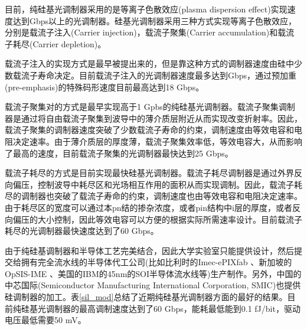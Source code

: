 目前，纯硅基光调制器采用的是等离子色散效应(plasma dispersion effect)实现速度达到Gbps以上的光调制器。硅基光调制器采用三种方式实现等离子色散效应，分别是载流子注入(Carrier injection)，载流子聚集(Carrier accumulation)和载流子耗尽(Carrier depletion)。

载流子注入的实现方式是最早被提出来的，但是靠这种方式的调制器速度由硅中少数载流子寿命决定。目前载流子注入的光调制器速度最多达到Gbps，通过预加重(pre-emphasis)的特殊码形速度目前最高达到18 Gbps\cite{manipatruni2007high}。

载流子聚集对的方式是最早实现高于1 Gpbs的纯硅基光调制器。载流子聚集调制器是通过将自由载流子聚集到波导中的薄介质层附近从而实现改变折射率。因此，载流子聚集的调制器速度突破了少数载流子寿命的约束，调制速度由等效电容和电阻决定速率。由于薄介质层的厚度薄，载流子聚集效率低，等效电容大，从而影响了最高的速度，目前载流子聚集的光调制器最快达到25 Gbps\cite{fujikata201025}。

载流子耗尽的方式是目前实现最快硅基光调制器。载流子耗尽调制器是通过外界反向偏压，控制波导中耗尽区和光场相互作用的面积从而实现调制。因此，载流子耗尽的调制器也突破了载流子寿命的约束，调制速度也由等效电容和电阻决定速率。由于耗尽区的宽度可以通过本pn结的掺杂浓度，或者pin结构中i层的厚度，或者反向偏压的大小控制，因此等效电容可以方便的根据实际所需速率设计。目前载流子耗尽的光调制器最快速度达到了60 Gbps\cite{Xiao201360}。

由于纯硅基调制器和半导体工艺完美结合，因此大学实验室只能提供设计，然后提交给拥有完全流水线的半导体代工公司(比如比利时的Imec-ePIXfab \cite{Imec, absil2015silicon}、新加坡的OpSIS-IME \cite{novack201330}、美国的IBM的45nm的SOI半导体流水线\cite{narasimha2006high}等)生产制作。另外，中国的中芯国际(Semiconductor Manufacturing International Corporation, SMIC)也提供硅调制器的加工\cite{xu2012high,xiao2013high,Xiao201360}。表\ref{sil_mod}总结了近期纯硅基光调制器方面的最好的结果。目前纯硅基光调制器的最高调制速度达到了60 Gbps，能耗最低能到0.1 fJ/bit，驱动电压最低需要50 mV。

